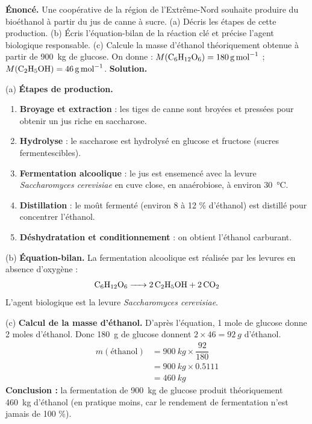 \documentclass[11pt]{article}
\begin{document}
\begin{exoresolu}
\textbf{Énoncé.} Une coopérative de la région de l'Extrême-Nord souhaite produire du bioéthanol à partir du jus de canne à sucre. (a) Décris les étapes de cette production. (b) Écris l'équation-bilan de la réaction clé et précise l'agent biologique responsable. (c) Calcule la masse d'éthanol théoriquement obtenue à partir de \SI{900}{kg} de glucose. On donne : $M(\ce{C6H12O6}) = \SI{180}{g.mol^{-1}}$ ; $M(\ce{C2H5OH}) = \SI{46}{g.mol^{-1}}$.
\tcblower
\textbf{Solution.}

(a) \textbf{Étapes de production.}
\begin{enumerate}
\item \textbf{Broyage et extraction} : les tiges de canne sont broyées et pressées pour obtenir un jus riche en saccharose.
\item \textbf{Hydrolyse} : le saccharose est hydrolysé en glucose et fructose (sucres fermentescibles).
\item \textbf{Fermentation alcoolique} : le jus est ensemencé avec la levure \emph{Saccharomyces cerevisiae} en cuve close, en anaérobiose, à environ \SI{30}{\celsius}.
\item \textbf{Distillation} : le moût fermenté (environ 8 à 12 \% d'éthanol) est distillé pour concentrer l'éthanol.
\item \textbf{Déshydratation et conditionnement} : on obtient l'éthanol carburant.
\end{enumerate}

(b) \textbf{Équation-bilan.} La fermentation alcoolique est réalisée par les levures en absence d'oxygène :
\[ \ce{C6H12O6 -> 2 C2H5OH + 2 CO2} \]
L'agent biologique est la levure \emph{Saccharomyces cerevisiae}.

(c) \textbf{Calcul de la masse d'éthanol.}
D'après l'équation, 1 mole de glucose donne 2 moles d'éthanol. Donc \SI{180}{g} de glucose donnent $2 \times 46 = \SI{92}{g}$ d'éthanol.
\begin{align*}
m(\text{éthanol}) &= \SI{900}{kg} \times \dfrac{92}{180} \\
&= \SI{900}{kg} \times \num{0,5111} \\
&= \SI{460}{kg}
\end{align*}
\textbf{Conclusion :} la fermentation de \SI{900}{kg} de glucose produit théoriquement \SI{460}{kg} d'éthanol (en pratique moins, car le rendement de fermentation n'est jamais de 100 \%).
\end{exoresolu}
\end{document}
